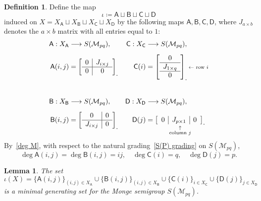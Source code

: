 \documentclass[noamsfonts,10pt]{amsart}
\newcommand{\M}{\mathcal{M}}
\newcommand{\sA}{\mathsf{A}}
\newcommand{\sB}{\mathsf{B}}
\newcommand{\sC}{\mathsf{C}}
\newcommand{\sD}{\mathsf{D}}
\newcommand{\1}{\mathbf{1}}
\theoremstyle{plain}
\newtheorem{lemma}[theorem]{Lemma}
\theoremstyle{definition}
\newtheorem{dfn}[theorem]{Definition}
\numberwithin{equation}{section}
\begin{document}
\begin{dfn}
    \label{def:iota ABCD}
    Define the map
    \[
        \iota \coloneqq \sA \sqcup \sB \sqcup \sC \sqcup \sD
    \]
    induced on $X = X_{\sA} \sqcup X_{\sB} \sqcup X_{\sC} \sqcup X_{\sD}$ by the following maps $\sA, \sB, \sC, \sD$, where $J_{a \times b}$ denotes the $a \times b$ matrix with all entries equal to $1$:
    \begin{align*}
        \sA : X_{\sA} &\longrightarrow S(\M_{pq}), &  
        \sC : X_{\sC} & \longrightarrow S(\M_{pq}), \\[1ex]
        \sA(i,j) &= \left[
        \begin{array}{c|c}
        0 & J_{i \times j} \\
        \hline
        0 & 0
        \end{array}
        \right]_{\textstyle .} & 
        \sC(i) &= \left[
        \begin{array}{c}
        0 \\
        \hline
        J_{1 \times q} \\
        \hline
        0
        \end{array}
        \right]_{\textstyle .} {\scriptstyle \textup{$\leftarrow$ row $i$}} \\[5ex]
        \sB : X_{\sB} &\longrightarrow S(\M_{pq}), & 
        \sD: X_{\sD} & \longrightarrow S(\M_{pq}), \\[1ex]
        \sB(i,j) &= \left[
        \begin{array}{c|c}
        0 & 0 \\
        \hline
        J_{i \times j} & 0
        \end{array}
        \right]_{\textstyle .} &
        \sD(j) &= \underset{\substack{\uparrow \\ \textup{column $j$}}}{\left[
        \begin{array}{c|c|c}
        0 & J_{p \times 1} & 0
        \end{array}
        \right]_{\textstyle .}}
    \end{align*}
    By~\eqref{deg M}, with respect to the natural grading~\eqref{S(P) grading} on $S(\M_{pq})$,
    \begin{equation}
        \label{deg ABCD}
        \deg \sA(i,j) = \deg \sB(i,j) = ij, \quad \deg \sC(i) = q, \quad \deg \sD(j) = p.
    \end{equation}
\end{dfn}

\begin{lemma}
    \label{lemma:rays}
    The set
    \[
        \iota(X) = \Big\{ \sA(i,j) \Big\}_{(i,j) \in X_{\sA}} \cup \Big\{ \sB(i,j) \Big\}_{(i,j) \in X_{\sB}} \cup \Big\{ \sC(i) \Big\}_{i \in X_{\sC}} \cup \Big\{ \sD(j) \Big\}_{j \in X_{\sD}}
    \]
    is a minimal generating set for the Monge semigroup $S(\M_{pq})$.
    
    \end{lemma}
\end{document}

